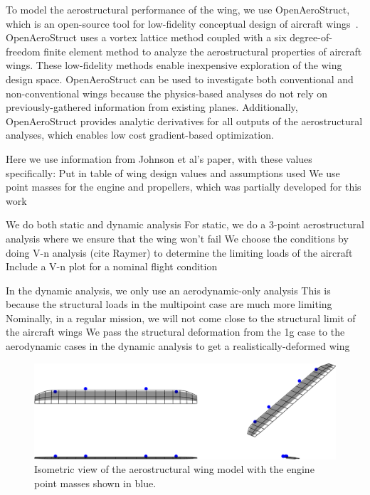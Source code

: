 
To model the aerostructural performance of the wing, we use OpenAeroStruct, which is an open-source tool for low-fidelity conceptual design of aircraft wings~\cite{Jasa2018a}.
OpenAeroStruct uses a vortex lattice method coupled with a six degree-of-freedom finite element method to analyze the aerostructural properties of aircraft wings.
These low-fidelity methods enable inexpensive exploration of the wing design space.
OpenAeroStruct can be used to investigate both conventional and non-conventional wings because the physics-based analyses do not rely on previously-gathered information from existing planes.
Additionally, OpenAeroStruct provides analytic derivatives for all outputs of the aerostructural analyses, which enables low cost gradient-based optimization.

Here we use information from Johnson et al's paper, with these values specifically:
Put in table of wing design values and assumptions used
We use point masses for the engine and propellers, which was partially developed for this work

We do both static and dynamic analysis
For static, we do a 3-point aerostructural analysis where we ensure that the wing won't fail
We choose the conditions by doing V-n analysis (cite Raymer) to determine the limiting loads of the aircraft
Include a V-n plot for a nominal flight condition

In the dynamic analysis, we only use an aerodynamic-only analysis
This is because the structural loads in the multipoint case are much more limiting
Nominally, in a regular mission, we will not come close to the structural limit of the aircraft wings
We pass the structural deformation from the 1g case to the aerodynamic cases in the dynamic analysis to get a realistically-deformed wing

\begin{figure}
\begin{center}
 \includegraphics[width=1.0\textwidth]{../Images/aerostruct_wing}
 \caption{Isometric view of the aerostructural wing model with the engine point masses shown in blue.}
 \label{f:OAS_wing}
\end{center}
\end{figure}

